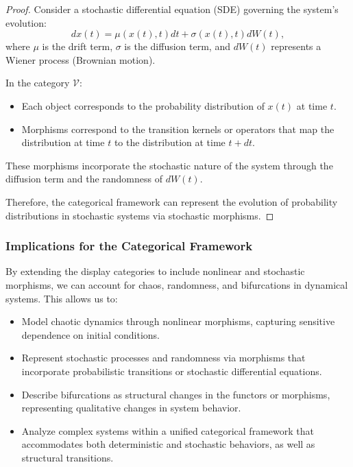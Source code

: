 \documentclass{article}
\theoremstyle{definition}
\theoremstyle{remark}
\begin{document}
	\begin{proof}
		Consider a stochastic differential equation (SDE) governing the system's evolution:
		\[
		dx(t) = \mu(x(t), t) dt + \sigma(x(t), t) dW(t),
		\]
		where $\mu$ is the drift term, $\sigma$ is the diffusion term, and $dW(t)$ represents a Wiener process (Brownian motion).
		
		In the category $\mathcal{V}$:
		\begin{itemize}
			\item Each object corresponds to the probability distribution of $x(t)$ at time $t$.
			\item Morphisms correspond to the transition kernels or operators that map the distribution at time $t$ to the distribution at time $t + dt$.
		\end{itemize}
		
		These morphisms incorporate the stochastic nature of the system through the diffusion term and the randomness of $dW(t)$.
		
		Therefore, the categorical framework can represent the evolution of probability distributions in stochastic systems via stochastic morphisms.
	\end{proof}
	
	\subsubsection{Implications for the Categorical Framework}
	
	By extending the display categories to include nonlinear and stochastic morphisms, we can account for chaos, randomness, and bifurcations in dynamical systems. This allows us to:
	
	\begin{itemize}
		\item Model chaotic dynamics through nonlinear morphisms, capturing sensitive dependence on initial conditions.
		\item Represent stochastic processes and randomness via morphisms that incorporate probabilistic transitions or stochastic differential equations.
		\item Describe bifurcations as structural changes in the functors or morphisms, representing qualitative changes in system behavior.
		\item Analyze complex systems within a unified categorical framework that accommodates both deterministic and stochastic behaviors, as well as structural transitions.
	\end{itemize}
	
\end{document}
